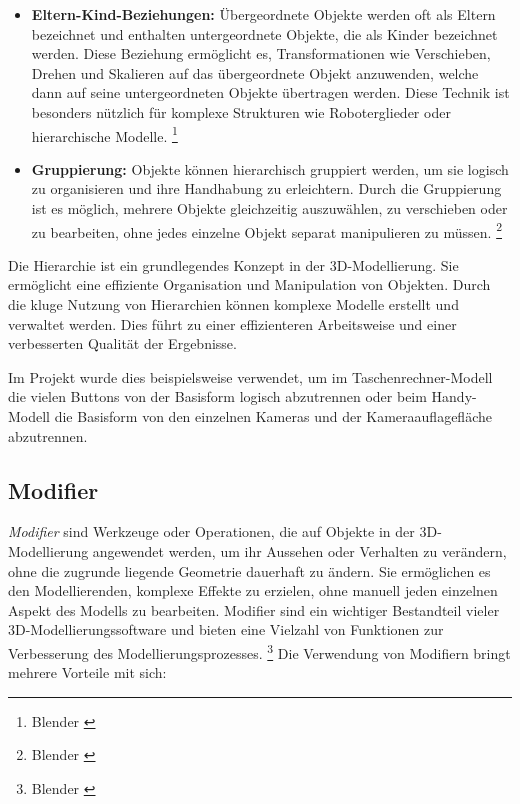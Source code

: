 \begin{itemize}
    \item \textbf{Eltern-Kind-Beziehungen:} Übergeordnete Objekte werden oft als Eltern bezeichnet und enthalten untergeordnete Objekte, die als Kinder bezeichnet werden. Diese Beziehung ermöglicht es, Transformationen wie Verschieben, Drehen und Skalieren auf das übergeordnete Objekt anzuwenden, welche dann auf seine untergeordneten Objekte übertragen werden. Diese Technik ist besonders nützlich für komplexe Strukturen wie Roboterglieder oder hierarchische Modelle. \footnote{Blender \cite {Parents}}
    \item \textbf{Gruppierung:} Objekte können hierarchisch gruppiert werden, um sie logisch zu organisieren und ihre Handhabung zu erleichtern. Durch die Gruppierung ist es möglich, mehrere Objekte gleichzeitig auszuwählen, zu verschieben oder zu bearbeiten, ohne jedes einzelne Objekt separat manipulieren zu müssen. \footnote{Blender \cite{Groups}}
\end{itemize}
Die Hierarchie ist ein grundlegendes Konzept in der 3D-Modellierung. Sie ermöglicht eine effiziente Organisation und Manipulation von Objekten. Durch die kluge Nutzung von Hierarchien können komplexe Modelle erstellt und verwaltet werden. Dies führt zu einer effizienteren Arbeitsweise und einer verbesserten Qualität der Ergebnisse.

Im Projekt wurde dies beispielsweise verwendet, um im Taschenrechner-Modell die vielen Buttons von der Basisform logisch abzutrennen oder beim Handy-Modell die Basisform von den einzelnen Kameras und der Kameraauflagefläche abzutrennen.

\subsection{Modifier}
\textit{Modifier} sind Werkzeuge oder Operationen, die auf Objekte in der 3D-Modellierung angewendet werden, um ihr Aussehen oder Verhalten zu verändern, ohne die zugrunde liegende Geometrie dauerhaft zu ändern. Sie ermöglichen es den Modellierenden, komplexe Effekte zu erzielen, ohne manuell jeden einzelnen Aspekt des Modells zu bearbeiten. Modifier sind ein wichtiger Bestandteil vieler 3D-Modellierungssoftware und bieten eine Vielzahl von Funktionen zur Verbesserung des Modellierungsprozesses. \footnote{Blender \cite {Modifier}}
Die Verwendung von Modifiern bringt mehrere Vorteile mit sich:

